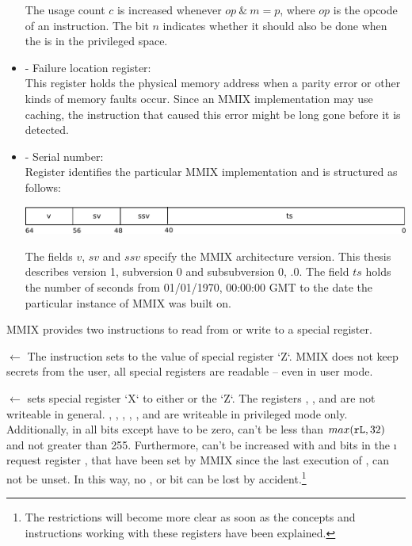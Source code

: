 \begin{itemize}
	The usage count $c$ is increased whenever $op~\&~m = p$, where $op$ is the opcode of an instruction. The bit $n$ indicates whether it should also be done when the  is in the privileged space. \citep[pg. 32]{mmix-doc}
	\item {} - Failure location register:\\
	This register holds the physical memory address when a parity error or other kinds of memory faults occur. Since an MMIX implementation may use caching, the instruction that caused this error might be long gone before it is detected. \citep[pg. 40]{mmix-doc}
	\item {} - Serial number:\\
	Register  identifies the particular MMIX implementation and is structured as follows:
	
	\includegraphics[width=\linewidth]{img/rN-crop.pdf}
	
	The fields $v$, $sv$ and $ssv$ specify the MMIX architecture version. This thesis describes version 1, subversion 0 and subsubversion 0, .0. The field $ts$ holds the number of seconds from 01/01/1970, 00:00:00 GMT to the date the particular instance of MMIX was built on. \citep[pg. 32]{mmix-doc}
\end{itemize}

\noindent MMIX provides two instructions to read from or write to a special register.

\instrtbl
	{}
	{ $\leftarrow$ }
\noindent The instruction  sets  to the value of special register `Z`. MMIX does not keep secrets from the user, \ie all special registers are readable -- even in user mode. \citep[pg. 34]{mmix-doc}

\instrtbl
	{}
	{ $\leftarrow$ }
\noindent {} sets special register `X` to either  or the  `Z`. The registers , ,  and  are not writeable in general. , , , , ,  and  are writeable in privileged mode only. Additionally, in  all bits except  have to be zero,  can't be less than $max({\tt rL},32)$ and not greater than 255. Furthermore,  can't be increased with  and bits in the \i{ request register} , that have been set by MMIX since the last execution of , can not be unset. In this way, no ,  or  bit can be lost by accident.\footnote{The restrictions will become more clear as soon as the concepts and instructions working with these registers have been explained.} \citep[pg. 34]{mmix-doc}

